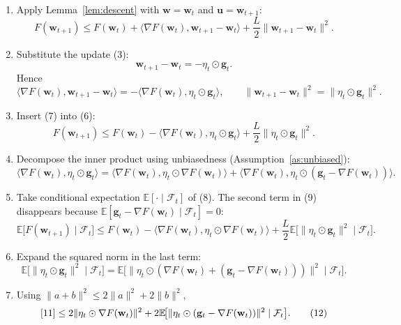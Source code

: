 \documentclass{article}
\newcommand{\E}{\mathbb{E}}
\begin{document}
\begin{enumerate}
\item[{\bf [Step 1]}] Apply Lemma~\ref{lem:descent} with $\mathbf w=\mathbf w_{t}$ and $\mathbf u=\mathbf w_{t+1}$:
\[
F(\mathbf w_{t+1})\le F(\mathbf w_{t})+\langle\nabla F(\mathbf w_{t}),\mathbf w_{t+1}-\mathbf w_{t}\rangle
+\frac{L}{2}\|\mathbf w_{t+1}-\mathbf w_{t}\|^{2}.
\tag{6}
\]

\item[{\bf [Step 2]}] Substitute the update (3):
\[
\mathbf w_{t+1}-\mathbf w_{t}= -\eta_{t}\odot\mathbf g_{t}.
\]
Hence
\[
\langle\nabla F(\mathbf w_{t}),\mathbf w_{t+1}-\mathbf w_{t}\rangle
= -\langle\nabla F(\mathbf w_{t}),\eta_{t}\odot\mathbf g_{t}\rangle,
\qquad
\|\mathbf w_{t+1}-\mathbf w_{t}\|^{2}= \|\eta_{t}\odot\mathbf g_{t}\|^{2}.
\tag{7}
\]

\item[{\bf [Step 3]}] Insert (7) into (6):
\[
F(\mathbf w_{t+1})\le F(\mathbf w_{t})
- \langle\nabla F(\mathbf w_{t}),\eta_{t}\odot\mathbf g_{t}\rangle
+\frac{L}{2}\|\eta_{t}\odot\mathbf g_{t}\|^{2}.
\tag{8}
\]

\item[{\bf [Step 4]}] Decompose the inner product using unbiasedness (Assumption~\ref{as:unbiased}):
\[
\langle\nabla F(\mathbf w_{t}),\eta_{t}\odot\mathbf g_{t}\rangle
= \langle\nabla F(\mathbf w_{t}),\eta_{t}\odot\nabla F(\mathbf w_{t})\rangle
+ \langle\nabla F(\mathbf w_{t}),\eta_{t}\odot(\mathbf g_{t}-\nabla F(\mathbf w_{t}))\rangle.
\tag{9}
\]

\item[{\bf [Step 5]}] Take conditional expectation $\E[\cdot\mid\mathcal F_{t}]$ of (8). The second term in (9) disappears because $\E[\mathbf g_{t}-\nabla F(\mathbf w_{t})\mid\mathcal F_{t}]=0$:
\[
\E\!\big[F(\mathbf w_{t+1})\mid\mathcal F_{t}\big]
\le F(\mathbf w_{t})
- \langle\nabla F(\mathbf w_{t}),\eta_{t}\odot\nabla F(\mathbf w_{t})\rangle
+\frac{L}{2}\E\!\big[\|\eta_{t}\odot\mathbf g_{t}\|^{2}\mid\mathcal F_{t}\big].
\tag{10}
\]

\item[{\bf [Step 6]}] Expand the squared norm in the last term:
\[
\E\!\big[\|\eta_{t}\odot\mathbf g_{t}\|^{2}\mid\mathcal F_{t}\big]
= \E\!\big[\|\eta_{t}\odot(\nabla F(\mathbf w_{t})+(\mathbf g_{t}-\nabla F(\mathbf w_{t})))\|^{2}\mid\mathcal F_{t}\big].
\tag{11}
\]

\item[{\bf [Step 7]}] Using $\|a+b\|^{2}\le2\|a\|^{2}+2\|b\|^{2}$,
\[
\eqref{11}\le
2\|\eta_{t}\odot\nabla F(\mathbf w_{t})\|^{2}
+2\E\!\big[\|\eta_{t}\odot(\mathbf g_{t}-\nabla F(\mathbf w_{t}))\|^{2}\mid\mathcal F_{t}\big].
\tag{12}
\]


\end{enumerate}
\end{document}
